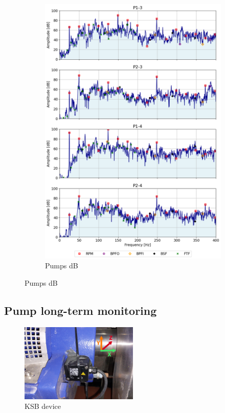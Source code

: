 \begin{figure}[h]
\begin{subfigure}[b]{0.24\textwidth}
        \includegraphics[width=\textwidth]{assets/results/defects/pumps-dB.png}
        \caption{Pumps dB}
    \end{subfigure}
\end{figure}


\subsection{Pump long-term monitoring}
\begin{figure}[h]
    \centering
    \includegraphics[width=0.5\textwidth]{assets/design/sensor/ksb-cloud.jpg}
    \caption{KSB device}
\end{figure}

